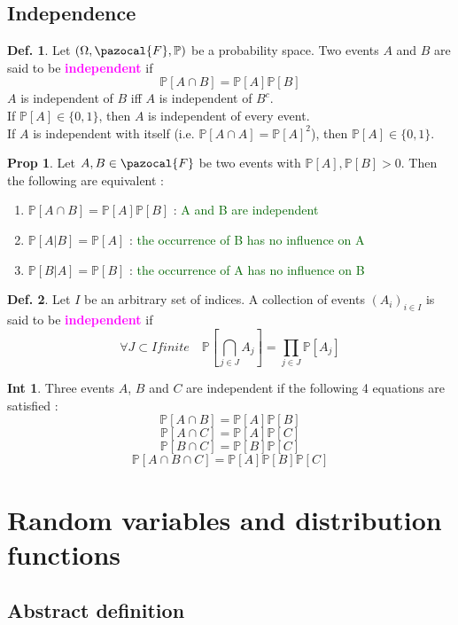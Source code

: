 \documentclass[8pt,a4paper,landscape]{article}
\theoremstyle{definition}
\newtheorem{definition}{Def.}[section]
\theoremstyle{example}
\theoremstyle{intuition}
\newtheorem*{intuition}{Int}
\theoremstyle{definition}
\newtheorem{proposition}{Prop}[section]
\newcommand{\Fb}{\pazocal{F}}
\newcommand{\mydef}[1]{\textcolor{magenta}{\textbf{#1}}}
\newcommand{\prob}[1]{\mathbb{P}\left[ #1 \right]}
\begin{document}
\begin{multicols}{3}
				
			\subsection{Independence}
			
				\begin{definition}
					Let $(\Omega, \Fb, \mathbb{P})$ be a probability space. Two events $A$ and $B$ are said to be \mydef{independent} if 
					$$
						\prob{A \cap B} = \prob{A} \prob{B}
					$$
					$A$ is independent of $B$ iff $A$ is independent of $B^c$. \\
					If $\prob{A} \in \{0,1\}$, then $A$ is independent of every event. \\
					If $A$ is independent with itself (i.e. $\prob{A \cap A} = \prob{A}^2$), then $\prob{A} \in \{0, 1\}$.
				\end{definition}
				
				\begin{proposition}
					Let $A, B \in \Fb$ be two events with $\prob{A}, \prob{B} > 0$. Then the following are equivalent :
					\begin{enumerate}[label=\roman*.]
						\item $\prob{A \cap B} = \prob{A} \prob{B}$ : \textcolor{DarkGreen}{A and B are independent}
						\item $\prob{A \lvert B} = \prob{A}$ : \textcolor{DarkGreen}{the occurrence of B has no influence on A}
						\item $\prob{B \lvert A} = \prob{B}$ : \textcolor{DarkGreen}{the occurrence of A has no influence on B}
					\end{enumerate} 
				\end{proposition}
				
				\begin{definition}
					Let $I$ be an arbitrary set of indices. A collection of events $(A_i)_{i \in I}$ is said to be \mydef{independent} if 
					$$
						\forall J \subset I finite \quad \prob{\bigcap\limits_{j \in J} A_j} = \prod_{j \in J} \prob{A_j}
					$$
				\end{definition}
				
				\begin{intuition}
					Three events $A$, $B$ and $C$ are independent if the following 4 equations are satisfied :
						$$\prob{A \cap B} = \prob{A} \prob{B} $$
						$$\prob{A \cap C} = \prob{A} \prob{C} $$
						$$\prob{B \cap C} = \prob{B} \prob{C} $$
						$$\prob{A \cap B \cap C} = \prob{A}\prob{B}\prob{C}$$
				\end{intuition}


	\newpage
	\section{Random variables and distribution functions}
			\subsection{Abstract definition}
				
				
				
	
	
\end{multicols}	
\end{document}
